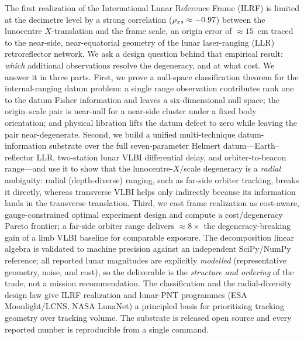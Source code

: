The first realization of the International Lunar Reference Frame (ILRF) is
limited at the decimetre level by a strong correlation ($\rho_{x s} \approx -0.97$)
between the lunocentre $X$-translation and the frame scale, an origin error of
$\approx\!15$~cm traced to the near-side, near-equatorial geometry of the lunar
laser-ranging (LLR) retroreflector network. We ask a design question behind that
empirical result: \emph{which} additional observations resolve the degeneracy,
and at what cost. We answer it in three parts. First, we prove a null-space
classification theorem for the internal-ranging datum problem: a single range
observation contributes rank one to the datum Fisher information and leaves a
six-dimensional null space; the origin--scale pair is near-null for a near-side
cluster under a fixed body orientation; and physical libration lifts the datum
defect to zero while leaving the pair near-degenerate. Second, we build a unified
multi-technique datum-information substrate over the full seven-parameter Helmert
datum---Earth--reflector LLR, two-station lunar VLBI differential delay, and
orbiter-to-beacon range---and use it to show that the lunocentre-$X$/scale
degeneracy is a \emph{radial} ambiguity: radial (depth-diverse) ranging, such as
far-side orbiter tracking, breaks it directly, whereas transverse VLBI helps only
indirectly because its information lands in the transverse translation. Third, we
cast frame realization as cost-aware, gauge-constrained optimal experiment design
and compute a cost/degeneracy Pareto frontier; a far-side orbiter range delivers
$\approx\!8\times$ the degeneracy-breaking gain of a limb VLBI baseline for
comparable exposure. The decomposition linear algebra is validated to machine
precision against an independent SciPy/NumPy reference; all reported lunar
magnitudes are explicitly \emph{modelled} (representative geometry, noise, and
cost), so the deliverable is the \emph{structure and ordering} of the trade, not a
mission recommendation. The classification and the radial-diversity design law
give ILRF realization and lunar-PNT programmes (ESA Moonlight/LCNS, NASA LunaNet)
a principled basis for prioritizing tracking geometry over tracking volume. The
substrate is released open source and every reported number is reproducible from a
single command.
